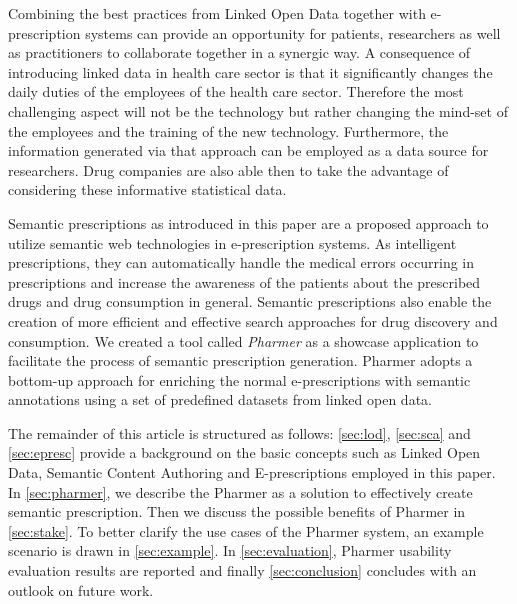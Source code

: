 \documentclass[conference]{IEEEtran}
\begin{document}
Combining the best practices from Linked Open Data together with e-prescription systems can provide an opportunity for patients, researchers as well as practitioners to collaborate together in a synergic way.
A consequence of introducing linked data in health care sector is that it significantly changes the daily duties of the employees of the health care sector.
Therefore the most challenging aspect will not be the technology but rather changing the mind-set of the employees and the training of the new technology\cite{challengesEP}.
Furthermore, the information generated via that approach can be employed as a data source for researchers.
Drug companies are also able then to take the advantage of considering these informative statistical data.

Semantic prescriptions as introduced in this paper are a proposed approach to utilize semantic web technologies in e-prescription systems.
As intelligent prescriptions, they can automatically handle the medical errors occurring in prescriptions and increase the awareness of the patients about the prescribed drugs and drug consumption in general.
Semantic prescriptions also enable the creation of more efficient and effective search approaches for drug discovery and consumption.
We created a tool called \emph{Pharmer} as a showcase application to facilitate the process of semantic prescription generation.
Pharmer adopts a bottom-up approach for enriching the normal e-prescriptions with semantic annotations using a set of predefined datasets from linked open data.

The remainder of this article is structured as follows:
\autoref{sec:lod}, \autoref{sec:sca} and \autoref{sec:epresc} provide a background on the basic concepts such as Linked Open Data, Semantic Content Authoring and E-prescriptions employed in this paper.
In \autoref{sec:pharmer}, we describe the Pharmer as a solution to effectively create semantic prescription.
Then we discuss the possible benefits of Pharmer in \autoref{sec:stake}.
To better clarify the use cases of the Pharmer system, an example scenario is drawn in \autoref{sec:example}.
In \autoref{sec:evaluation}, Pharmer usability evaluation results are reported and finally \autoref{sec:conclusion} concludes with an outlook on future work.
\end{document}
